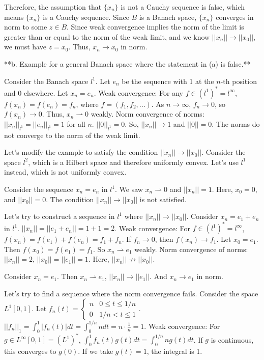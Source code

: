Therefore, the assumption that $\{x_n\}$ is not a Cauchy sequence is false, which means $\{x_n\}$ is a Cauchy sequence. Since $B$ is a Banach space, $\{x_n\}$ converges in norm to some $z \in B$. Since weak convergence implies the norm of the limit is greater than or equal to the norm of the weak limit, and we know $||x_n|| \to ||x_0||$, we must have $z = x_0$.
Thus, $x_n \to x_0$ in norm.

**b. Example for a general Banach space where the statement in (a) is false.**

Consider the Banach space $l^1$. Let $e_n$ be the sequence with 1 at the $n$-th position and 0 elsewhere.
Let $x_n = e_n$.
Weak convergence: For any $f \in (l^1)^* = l^\infty$, $f(x_n) = f(e_n) = f_n$, where $f = (f_1, f_2, ...)$.
As $n \to \infty$, $f_n \to 0$, so $f(x_n) \to 0$. Thus, $x_n \rightharpoonup 0$ weakly.
Norm convergence of norms: $||x_n||_{l^1} = ||e_n||_{l^1} = 1$ for all $n$.
$||0||_{l^1} = 0$.
So, $||x_n|| \to 1$ and $||0|| = 0$. The norms do not converge to the norm of the weak limit.

Let's modify the example to satisfy the condition $||x_n|| \to ||x_0||$.
Consider the space $l^2$, which is a Hilbert space and therefore uniformly convex.
Let's use $l^1$ instead, which is not uniformly convex.

Consider the sequence $x_n = e_n$ in $l^1$. We saw $x_n \rightharpoonup 0$ and $||x_n|| = 1$.
Here, $x_0 = 0$, and $||x_0|| = 0$. The condition $||x_n|| \to ||x_0||$ is not satisfied.

Let's try to construct a sequence in $l^1$ where $||x_n|| \to ||x_0||$.
Consider $x_n = e_1 + e_n$ in $l^1$.
$||x_n|| = ||e_1 + e_n|| = 1 + 1 = 2$.
Weak convergence: For $f \in (l^1)^* = l^\infty$, $f(x_n) = f(e_1) + f(e_n) = f_1 + f_n$.
If $f_n \to 0$, then $f(x_n) \to f_1$.
Let $x_0 = e_1$. Then $f(x_0) = f(e_1) = f_1$. So $x_n \rightharpoonup e_1$ weakly.
Norm convergence of norms: $||x_n|| = 2$, $||x_0|| = ||e_1|| = 1$.
Here, $||x_n|| \not\to ||x_0||$.

Consider $x_n = e_1$. Then $x_n \rightharpoonup e_1$, $||x_n|| \to ||e_1||$.
And $x_n \to e_1$ in norm.

Let's try to find a sequence where the norm convergence fails.
Consider the space $L^1[0, 1]$.
Let $f_n(t) = \begin{cases} n & 0 \le t \le 1/n \\ 0 & 1/n < t \le 1 \end{cases}$.
$||f_n||_1 = \int_0^1 |f_n(t)| dt = \int_0^{1/n} n dt = n \cdot \frac{1}{n} = 1$.
Weak convergence: For $g \in L^\infty[0, 1] = (L^1)^*$, $\int_0^1 f_n(t) g(t) dt = \int_0^{1/n} n g(t) dt$.
If $g$ is continuous, this converges to $g(0)$.
If we take $g(t) = 1$, the integral is 1.

